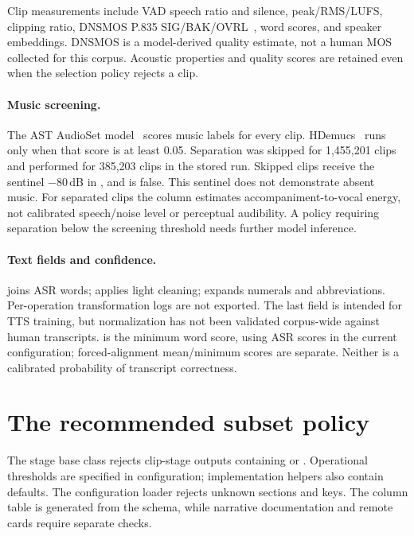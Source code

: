 \documentclass[11pt,a4paper]{article}
\begin{document}
Clip measurements include VAD speech ratio and silence, peak/RMS/LUFS,
clipping ratio, DNSMOS P.835 SIG/BAK/OVRL~\cite{dnsmos}, word scores,
and speaker embeddings. DNSMOS is a model-derived quality estimate, not a
human MOS collected for this corpus. Acoustic properties and quality scores
are retained even when the selection policy rejects a clip.

\paragraph{Music screening.}
The AST AudioSet model~\cite{ast} scores music labels for every clip.
HDemucs~\cite{hdemucs} runs only when that score is at least 0.05.
Separation was skipped for 1,455,201 clips and performed for 385,203
clips in the stored run. Skipped clips receive the sentinel $-80$\,dB in
, and
 is false. This sentinel does not demonstrate absent
music. For separated clips the column estimates accompaniment-to-vocal energy,
not calibrated speech/noise level or perceptual audibility. A policy requiring
separation below the screening threshold needs further model inference.

\paragraph{Text fields and confidence.}
 joins ASR words;  applies light cleaning;
 expands numerals and abbreviations. Per-operation transformation logs are not exported. The last field is intended for TTS training,
but normalization has not been validated corpus-wide against human transcripts.
 is the minimum word score, using ASR scores in the
current configuration; forced-alignment mean/minimum scores are separate.
Neither is a calibrated probability of transcript correctness.

\section{The recommended subset policy}
\label{sec:policy}
The stage base class rejects clip-stage outputs containing 
or . Operational thresholds are specified in configuration;
implementation helpers also contain defaults. The configuration loader rejects
unknown sections and keys. The column table is generated from the schema,
while narrative documentation and remote cards require separate checks.
\end{document}
